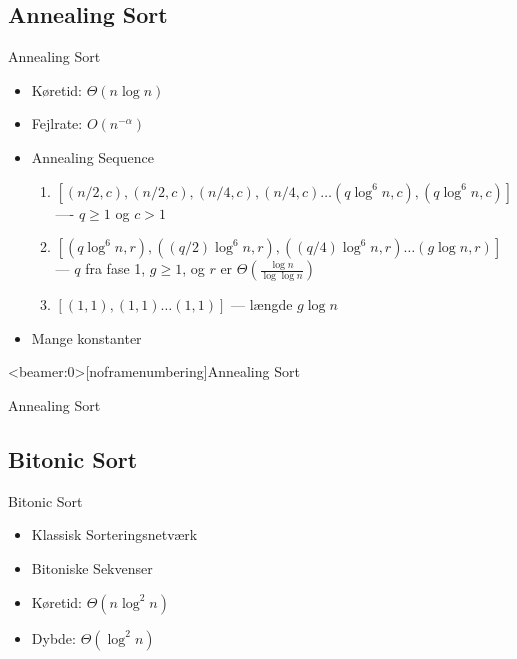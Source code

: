 \subsection{Annealing Sort}

\begin{frame}{Annealing Sort}
	{\center {}}
	\begin{itemize}
		\item Køretid: $\Theta(n \log n)$
		\item Fejlrate: $O(n^{-\alpha})$
		\item Annealing Sequence
			\begin{enumerate}
			\tiny
				\item $[(n/2, c), (n/2, c), (n/4, c), (n/4, c) \dots (q \log^6 n, c), (q \log^6 n, c)]$  ---- $q \geq 1$ og $c > 1$
				\item $[(q \log^6 n, r),((q/2) \log^6 n, r), ((q/4) \log^6 n, r) \dots (g \log n, r)]$ --- $q$ fra fase 1, $g \geq 1$,  og $r$ er $\Theta(\frac{\log n}{\log \log n})$
				\item $[(1,1), (1,1) \dots (1,1)]$ --- længde $g \log n$
		\end{enumerate}
		\item Mange konstanter
	\end{itemize}
\end{frame}

\begin{frame}<beamer:0>[noframenumbering]{Annealing Sort}
	\begin{block}{Annealing Sort}
		\scriptsize
		\begin{algorithmic}
						\EndFor
					\EndFor
						\EndFor
					\EndFor
				\EndFor
			\EndProcedure
		\end{algorithmic}
	\end{block}
\end{frame}

\subsection{Bitonic Sort}

\begin{frame}{Bitonic Sort}
	{\center {}}
	\begin{itemize}
	\item Klassisk Sorteringsnetværk
	\item Bitoniske Sekvenser
	\item Køretid: $\Theta(n \log^2 n)$
	\item Dybde: $\Theta(\log^2 n)$
	\end{itemize}
\end{frame}

